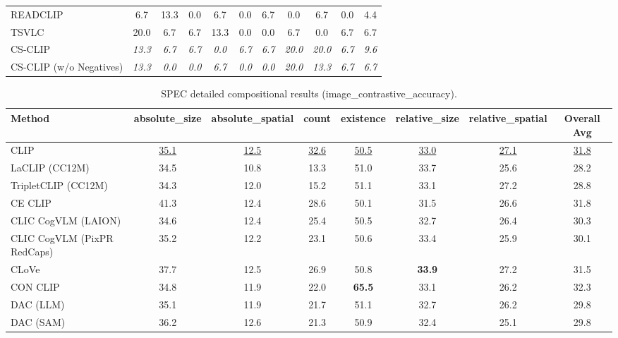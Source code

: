 \begin{table}[t]
\begin{adjustbox}{max width=\textwidth}
\begin{tabular}{p{5cm}c|c|c|c|c|c|c|c|c|c}
    READCLIP & 6.7 & 13.3 & 0.0 & 6.7 & 0.0 & 6.7 & 0.0 & 6.7 & 0.0 & 4.4 \\
    TSVLC & 20.0 & 6.7 & 6.7 & 13.3 & 0.0 & 0.0 & 6.7 & 0.0 & 6.7 & 6.7 \\
    \midrule
    CS-CLIP & \emph{13.3} & \emph{6.7} & \emph{6.7} & \emph{0.0} & \emph{6.7} & \emph{6.7} & \emph{20.0} & \emph{20.0} & \emph{6.7} & \emph{9.6} \\
    CS-CLIP (w/o Negatives) & \emph{13.3} & \emph{0.0} & \emph{0.0} & \emph{6.7} & \emph{0.0} & \emph{0.0} & \emph{20.0} & \emph{13.3} & \emph{6.7} & \emph{6.7} \\
    \bottomrule
  \end{tabular}
  \end{adjustbox}
\end{table}

\begin{table}[t]
  \centering
  \scriptsize
  \caption{SPEC detailed compositional results (image_contrastive_accuracy).}
  \label{tab:SPEC_detailed}
  \begin{adjustbox}{max width=\textwidth}
  \setlength{\tabcolsep}{2pt}
  \begin{tabular}{p{5cm}c|c|c|c|c|c|c}
    \toprule
    Method & absolute\_size & absolute\_spatial & count & existence & relative\_size & relative\_spatial & Overall Avg \\
    \midrule
    CLIP & \underline{35.1} & \underline{12.5} & \underline{32.6} & \underline{50.5} & \underline{33.0} & \underline{27.1} & \underline{31.8} \\
    \midrule
    LaCLIP (CC12M) & 34.5 & 10.8 & 13.3 & 51.0 & 33.7 & 25.6 & 28.2 \\
    TripletCLIP (CC12M) & 34.3 & 12.0 & 15.2 & 51.1 & 33.1 & 27.2 & 28.8 \\
    \midrule
    CE CLIP & 41.3 & 12.4 & 28.6 & 50.1 & 31.5 & 26.6 & 31.8 \\
    CLIC CogVLM (LAION) & 34.6 & 12.4 & 25.4 & 50.5 & 32.7 & 26.4 & 30.3 \\
    CLIC CogVLM (PixPR RedCaps) & 35.2 & 12.2 & 23.1 & 50.6 & 33.4 & 25.9 & 30.1 \\
    CLoVe & 37.7 & 12.5 & 26.9 & 50.8 & \textbf{33.9} & 27.2 & 31.5 \\
    CON CLIP & 34.8 & 11.9 & 22.0 & \textbf{65.5} & 33.1 & 26.2 & 32.3 \\
    DAC (LLM) & 35.1 & 11.9 & 21.7 & 51.1 & 32.7 & 26.2 & 29.8 \\
    DAC (SAM) & 36.2 & 12.6 & 21.3 & 50.9 & 32.4 & 25.1 & 29.8 \\

\end{tabular}
\end{adjustbox}
\end{table}
